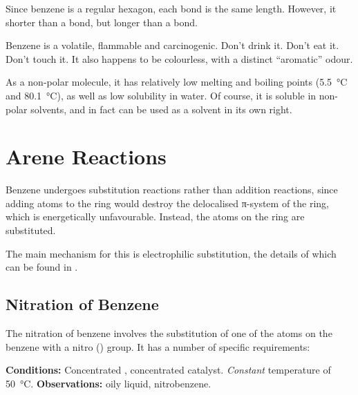 			Since benzene is a regular hexagon, each  bond is the same length. However, it shorter than a  bond, but longer
			than a  bond.

			Benzene is a volatile, flammable and carcinogenic. Don't drink it. Don't eat it. Don't touch it. It also happens to be colourless,
			with a distinct \enquote{aromatic} odour.

			As a non-polar molecule, it has relatively low melting and boiling points (\SI{5.5}{\celsius} and \SI{80.1}{\celsius}), as well as low
			solubility in water. Of course, it is soluble in non-polar solvents, and in fact can be used as a solvent in its own right.



	\pagebreak
	\hypertarget{AreneReactions}{}
	\section{Arene Reactions}

		Benzene undergoes substitution reactions rather than addition reactions, since adding atoms to the ring would destroy the
		delocalised π-system of the ring, which is energetically unfavourable. Instead, the  atoms on the ring are substituted.

		The main mechanism for this is electrophilic substitution, the details of which can be found in
		\hyperlink{AppendixElectrophilicSubstitution}{}.


		\subsection{Nitration of Benzene}

			The nitration of benzene involves the substitution of one of the  atoms on the benzene with a nitro () group.
			It has a number of specific requirements:

			\vspace{1.5em}
			\vbox{\textbf{Conditions:}	\tabto{35mm}Concentrated , concentrated  catalyst.
										\tabto{35mm}\textit{Constant} temperature of \SI{50}{\celsius}.}
			\vspace{0.75em}
			\vbox{\textbf{Observations:}\tabto{35mm} oily liquid, nitrobenzene.}



